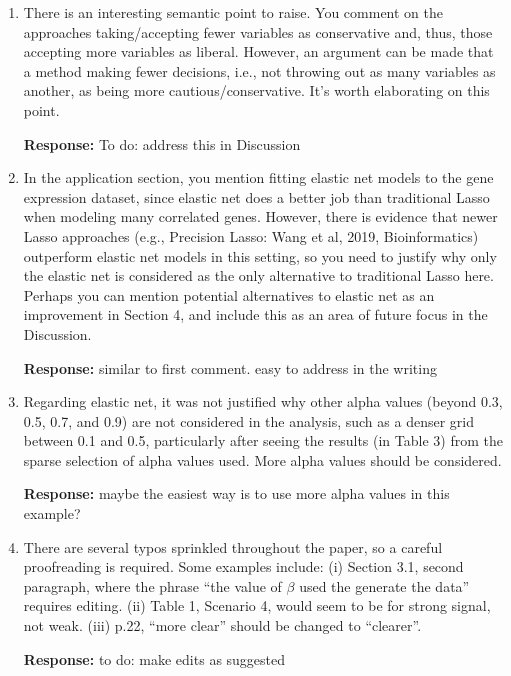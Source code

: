 \documentclass[12]{article}
\newcommand{\re}{\textbf{Response: }}
\newcommand\bd[1]{{\color{blue}#1}}
\begin{document}
\begin{enumerate}[align = left]
\re \bd{Easy to address. To do: clarify more in the writing}

\item There is an interesting semantic point to raise. You comment on the approaches taking/accepting fewer variables as conservative and, thus, those accepting more variables as liberal. However, an argument can be made that a method making fewer decisions, i.e., not throwing out as many variables as another, as being more cautious/conservative. It’s worth elaborating on this point.

\re \bd{To do: address this in Discussion}

\item In the application section, you mention fitting elastic net models to the gene expression dataset, since elastic net does a better job than traditional Lasso when modeling many correlated genes. However, there is evidence that newer Lasso approaches (e.g., Precision Lasso: Wang et al, 2019, Bioinformatics) outperform elastic net models in this setting, so you need to justify why only the elastic net is considered as the only alternative to traditional Lasso here. Perhaps you can mention potential alternatives to elastic net as an improvement in Section 4, and include this as an area of future focus in the Discussion.

\re \bd{similar to first comment. easy to address in the writing}

\item Regarding elastic net, it was not justified why other alpha values (beyond 0.3, 0.5, 0.7, and 0.9) are not considered in the analysis, such as a denser grid between 0.1 and 0.5, particularly after seeing the results (in Table 3) from the sparse selection of alpha values used. More alpha values should be considered.

\re \bd{maybe the easiest way is to use more alpha values in this example?}

\item There are several typos sprinkled throughout the paper, so a careful proofreading is required. Some examples include: (i) Section 3.1, second paragraph, where the phrase “the value of $\beta$ used the generate the data” requires editing. (ii) Table 1, Scenario 4, would seem to be for
strong signal, not weak. (iii) p.22, “more clear” should be changed to “clearer”.

\re \bd{to do: make edits as suggested}

\end{enumerate}
\end{document}
